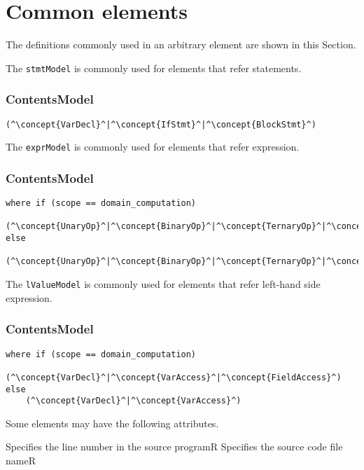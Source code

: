 \section{Common elements}
The definitions commonly used in an arbitrary element are shown in this Section.

The {\tt stmtModel} is commonly used for elements that refer statements.

\subsubsection*{ContentsModel}{}

\begin{lstlisting}[style=default,frame=none]
(^\concept{VarDecl}^|^\concept{IfStmt}^|^\concept{BlockStmt}^)
\end{lstlisting}


The {\tt exprModel} is commonly used for elements that refer expression.

\subsubsection*{ContentsModel}{}

\begin{lstlisting}[style=default,frame=none]
where if (scope == domain_computation)    
    (^\concept{UnaryOp}^|^\concept{BinaryOp}^|^\concept{TernaryOp}^|^\concept{Literal}^|^\concept{FieldAccess}^|^\concept{VarAccess}^|^\concept{FctCall}^)
else
    (^\concept{UnaryOp}^|^\concept{BinaryOp}^|^\concept{TernaryOp}^|^\concept{VarAccess}^|^\concept{Literal}^|^\concept{FctCall}^)
\end{lstlisting}


The {\tt lValueModel} is commonly used for elements that refer left-hand side
expression.

\subsubsection*{ContentsModel}{}

\begin{lstlisting}[style=default,frame=none]
where if (scope == domain_computation)    
    (^\concept{VarDecl}^|^\concept{VarAccess}^|^\concept{FieldAccess}^)
else
    (^\concept{VarDecl}^|^\concept{VarAccess}^)
\end{lstlisting}



Some elements may have the following attributes. 
\begin{HIRAttributes}
    {Specifies the line number in the source program}{R}
    {Specifies the source code file name}{R}
\end{HIRAttributes}


